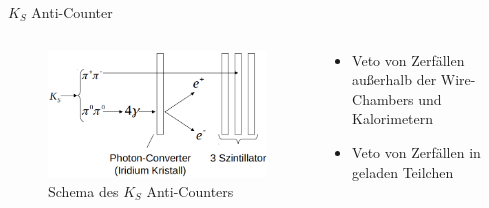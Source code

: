 \documentclass[aspectratio=1610, professionalfonts, 9pt, t]{beamer}
\begin{document}
  \begin{frame}{$K_S$ Anti-Counter}
    \begin{columns}[onlytextwidth]
      \begin{column}{0.4\textwidth}
        \begin{figure}[ht]
          \begin{center}
            \includegraphics[width=1.2\textwidth]{Images/na48aksschema.png} %
            \caption{Schema des $K_S$ Anti-Counters}
          \end{center}
        \end{figure}
      \end{column}
      \begin{column}{0.5\textwidth}
        \begin{itemize}
          \item Veto von Zerfällen außerhalb der Wire-Chambers und Kalorimetern
          \item[\rightarrow] Veto von Zerfällen in geladen Teilchen
        \end{itemize}
      \end{column}
    \end{columns}
  \end{frame}
\end{document}
